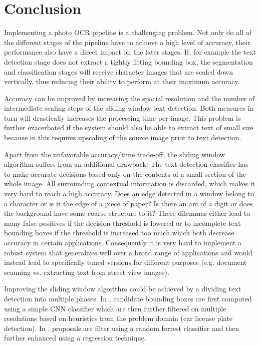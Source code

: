 \documentclass[11pt]{article}
\begin{document}
\section{Conclusion}
Implementing a photo OCR pipeline is a challenging problem. Not only do all of the different stages
of the pipeline have to achieve a high level of accuracy, their performance also have a direct
impact on the later stages. If, for example the text detection stage does not extract a tightly
fitting bounding box, the segmentation and classification stages will receive character images
that are scaled down vertically, thus reducing their ability to perform at their maximum
accuracy.

Accuracy can be improved by increasing the spacial resolution and the number of intermediate scaling steps
of the sliding window text detection.
Both measures in turn will drastically increases the processing time per image. This problem is
further exacerbated if the system should also be able to extract text of small size because in this requires
upscaling of the source image prior to text detection.

Apart from the unfavorable accuracy/time trade-off, the sliding window algorithm suffers from an additional
drawback: The text detection classifier has to make accurate decisions based only on the contents
of a small section of the whole image. All surrounding contextual information is discarded, which
makes it very hard to reach a high accuracy. Does an edge detected in a window belong to a character
or is it the edge of a piece of paper? Is there an arc of a digit or does the background have
some coarse structure to it? These dilemmas either lead to many false positives if the
decision threshold is lowered or to incomplete text bounding boxes if the threshold is increased
too much which both decrease accuracy in certain applications. Consequently it is very hard
to implement a robust system that generalizes well over a broad range of applications and
would instead lead to specifically tuned versions for different purposes
(e.g. document scanning vs. extracting text from street view images).

Improving the sliding window algorithm could be achieved by a dividing text detection into
multiple phases. In \cite{Li2016}, candidate bounding boxes are first computed using a
simple CNN classifier which are then further filtered on multiple resolutions
based on heuristics from the problem domain (car license plate detection). In \cite{Jaderberg2016},
proposals are filter using a random forrest classifier and then further enhanced using a regression
technique.
\end{document}

